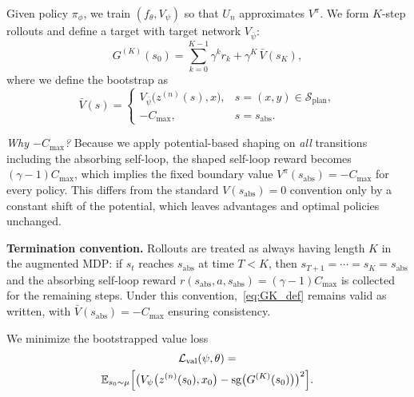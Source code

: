 \documentclass{article}
\theoremstyle{plain}
\theoremstyle{definition}
\theoremstyle{remark}
\newcommand{\E}{\mathbb{E}}
\newcommand{\SSS}{\mathcal{S}}
\newcommand{\sg}{\operatorname{sg}}
\begin{document}
{Given policy $\pi_\phi$, we train $(f_\theta,V_\psi)$ so that $U_n$ approximates $V^\pi$.
We form $K$-step rollouts and define a target with target network $V_{\bar\psi}$:
\begin{equation}
G^{(K)}(s_0)
=
\sum_{k=0}^{K-1}\gamma^k r_k
+
\gamma^K \, \bar V(s_K),
\label{eq:GK_def}
\end{equation}
where we define the bootstrap as
\[
\bar V(s)
=
\begin{cases}
V_{\bar\psi}\bigl(z^{(n)}(s),x\bigr), & s=(x,y)\in\SSS_{\mathrm{plan}},\\
-C_{\max}, & s=s_{\mathrm{abs}}.
\end{cases}
\]

\emph{Why $-C_{\max}$?}
Because we apply potential-based shaping on \emph{all} transitions including the absorbing self-loop, the shaped self-loop reward becomes $(\gamma-1)C_{\max}$, which implies the fixed boundary value $V^\pi(s_{\mathrm{abs}})=-C_{\max}$ for every policy.
This differs from the standard $V(s_{\mathrm{abs}})=0$ convention only by a constant shift of the potential, which leaves advantages and optimal policies unchanged.


\textbf{Termination convention.}
Rollouts are treated as always having length $K$ in the augmented MDP: if $s_t$ reaches $s_{\mathrm{abs}}$ at time $T < K$, then $s_{T+1}=\cdots=s_K=s_{\mathrm{abs}}$ and the absorbing self-loop reward $r(s_{\mathrm{abs}},a,s_{\mathrm{abs}})=(\gamma-1)C_{\max}$ is collected for the remaining steps.
Under this convention,~\eqref{eq:GK_def} remains valid as written, with $\bar V(s_{\mathrm{abs}})=-C_{\max}$ ensuring consistency.

We minimize the bootstrapped value loss
\begin{multline}
\mathcal{L}_{\mathrm{val}}(\psi,\theta)
=\\
\E_{s_0\sim\mu}\Bigl[
   \bigl(V_\psi\bigl(z^{(n)}(s_0),x_0\bigr)
   -
   \sg\bigl(G^{(K)}(s_0)\bigr)\bigr)^2
\Bigr].
\label{eq:KBR_loss}
\end{multline}}
\end{document}
